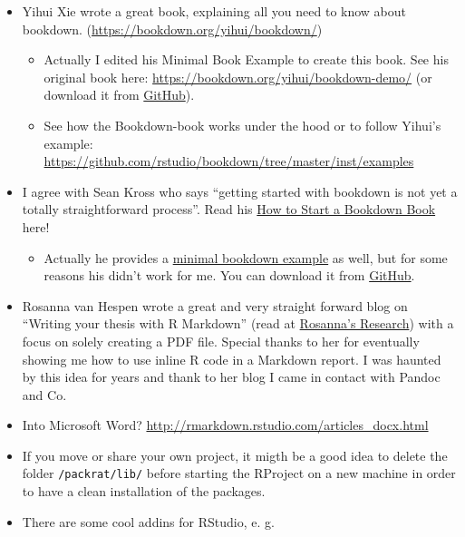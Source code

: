 \documentclass[]{book}
\providecommand{\tightlist}{%
  \setlength{\itemsep}{0pt}\setlength{\parskip}{0pt}}
\theoremstyle{definition}
\theoremstyle{definition}
\theoremstyle{remark}
\begin{document}
\begin{itemize}
\item
  Yihui Xie wrote a great book, explaining all you need to know about
  bookdown. (\url{https://bookdown.org/yihui/bookdown/})

  \begin{itemize}
  \tightlist
  \item
    Actually I edited his Minimal Book Example to create this book. See
    his original book here:
    \url{https://bookdown.org/yihui/bookdown-demo/} (or download it from
    \href{https://github.com/rstudio/bookdown-demo}{GitHub}).
  \item
    See how the Bookdown-book works under the hood or to follow Yihui's
    example:
    \url{https://github.com/rstudio/bookdown/tree/master/inst/examples}
  \end{itemize}
\item
  I agree with Sean Kross who says ``getting started with bookdown is
  not yet a totally straightforward process''. Read his
  \href{http://seankross.com/2016/11/17/How-to-Start-a-Bookdown-Book.html}{How
  to Start a Bookdown Book} here!

  \begin{itemize}
  \tightlist
  \item
    Actually he provides a
    \href{http://seankross.com/bookdown-start/diving-in.html}{minimal
    bookdown example} as well, but for some reasons his didn't work for
    me. You can download it from
    \href{https://github.com/seankross/bookdown-start}{GitHub}.
  \end{itemize}
\item
  Rosanna van Hespen wrote a great and very straight forward blog on
  ``Writing your thesis with R Markdown'' (read at
  \href{https://rosannavanhespenresearch.wordpress.com/2016/03/29/writing-your-thesis-with-r-markdown-4-putting-the-thesis-together/}{Rosanna's
  Research}) with a focus on solely creating a PDF file. Special thanks
  to her for eventually showing me how to use inline R code in a
  Markdown report. I was haunted by this idea for years and thank to her
  blog I came in contact with Pandoc and Co.
\item
  Into Microsoft Word?
  \url{http://rmarkdown.rstudio.com/articles_docx.html}
\item
  If you move or share your own project, it migth be a good idea to
  delete the folder \texttt{/packrat/lib/} before starting the RProject
  on a new machine in order to have a clean installation of the
  packages.
\item
  There are some cool addins for RStudio, e. g.


\end{itemize}
\end{document}
